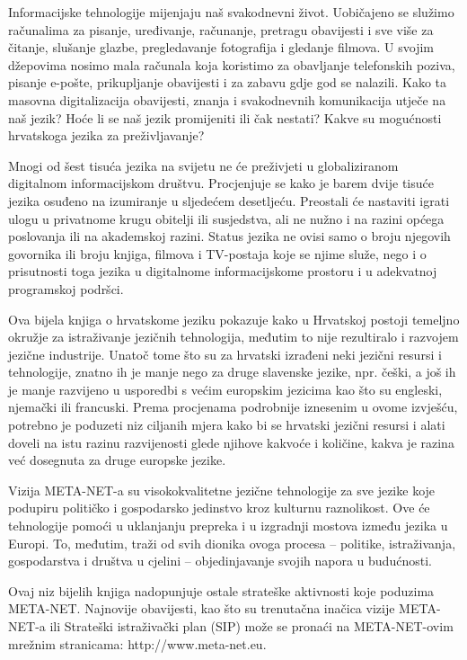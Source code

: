 \begin{multicols}{2}
Informacijske tehnologije mijenjaju naš svakodnevni život. Uobičajeno se služimo računalima za pisanje, uređivanje, računanje, pretragu obavijesti i sve više za čitanje, slušanje glazbe, pregledavanje fotografija i gledanje filmova. U svojim džepovima nosimo mala računala koja koristimo za obavljanje telefonskih poziva, pisanje e-pošte, prikupljanje obavijesti i za zabavu gdje god se nalazili. Kako ta masovna digitalizacija obavijesti, znanja i svakodnevnih komunikacija utječe na naš jezik? Hoće li se naš jezik promijeniti ili čak nestati? Kakve su mogućnosti hrvatskoga jezika za preživljavanje?

Mnogi od šest tisuća jezika na svijetu ne će preživjeti u globaliziranom digitalnom informacijskom društvu. Procjenjuje se kako je barem dvije tisuće jezika osuđeno na izumiranje u sljedećem desetljeću. Preostali će nastaviti igrati ulogu u privatnome krugu obitelji ili susjedstva, ali ne nužno i na razini općega poslovanja ili na akademskoj razini. Status jezika ne ovisi samo o broju njegovih govornika ili broju knjiga, filmova i TV-postaja koje se njime služe, nego i o prisutnosti toga jezika u digitalnome informacijskome prostoru i u adekvatnoj programskoj podršci.

Ova bijela knjiga o hrvatskome jeziku pokazuje kako u Hrvatskoj postoji temeljno okružje za istraživanje jezičnih tehnologija, međutim to nije rezultiralo i razvojem jezične industrije. Unatoč tome što su za hrvatski izrađeni neki jezični resursi i tehnologije, znatno ih je manje nego za druge slavenske jezike, npr. češki, a još ih je manje razvijeno u usporedbi s većim europskim jezicima kao što su engleski, njemački ili francuski. Prema procjenama podrobnije iznesenim u ovome izvješću, potrebno je poduzeti niz ciljanih mjera kako bi se hrvatski jezični resursi i alati doveli na istu razinu razvijenosti glede njihove kakvoće i količine, kakva je razina već dosegnuta za druge europske jezike.

Vizija META-NET-a su visokokvalitetne jezične tehnologije za sve jezike koje podupiru političko i gospodarsko jedinstvo kroz kulturnu raznolikost. Ove će tehnologije pomoći u uklanjanju prepreka i u izgradnji mostova između jezika u Europi. To, međutim, traži od svih dionika ovoga procesa – politike, istraživanja, gospodarstva i društva u cjelini – objedinjavanje svojih napora u budućnosti.

Ovaj niz bijelih knjiga nadopunjuje ostale strateške aktivnosti koje poduzima META-NET. Najnovije obavijesti, kao što su trenutačna inačica vizije META-NET-a\cite{str1} ili Strateški istraživački plan (SIP) može se pronaći na META-NET-ovim mrežnim stranicama: http://www.meta-net.eu.

\end{multicols}

